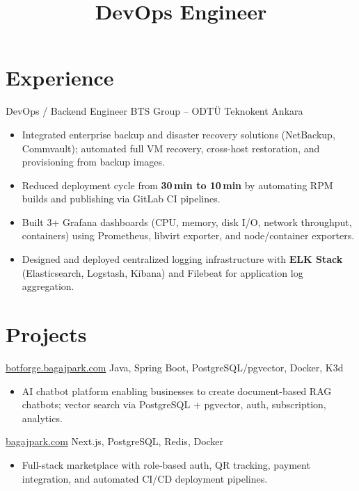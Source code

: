 \documentclass[10pt,a4paper,sans]{moderncv}
\title{DevOps Engineer}
\begin{document}
\makecvtitle

\section{Experience}

{DevOps / Backend Engineer}
{BTS Group -- ODTÜ Teknokent}
{Ankara}
{}{
\begin{itemize}
    \setlength\itemsep{0pt}
    \item Integrated enterprise backup and disaster recovery solutions (NetBackup, Commvault);
          automated full VM recovery, cross-host restoration, and provisioning from backup images.
    \item Reduced deployment cycle from \textbf{30\,min to 10\,min} by automating RPM builds
          and publishing via GitLab CI pipelines.
    \item Built 3+ Grafana dashboards (CPU, memory, disk I/O, network throughput, containers)
          using Prometheus, libvirt exporter, and node/container exporters.
    \item Designed and deployed centralized logging infrastructure with \textbf{ELK Stack}
          (Elasticsearch, Logstash, Kibana) and Filebeat for application log aggregation.
\end{itemize}
}

\section{Projects}

{\href{https://botforge.bagajpark.com}{botforge.bagajpark.com}}{}
{Java, Spring Boot, PostgreSQL/pgvector, Docker, K3d}
{\begin{itemize}\setlength\itemsep{0pt}
    \item AI chatbot platform enabling businesses to create document-based RAG chatbots;
          vector search via PostgreSQL + pgvector, auth, subscription, analytics.
\end{itemize}}

{\href{https://bagajpark.com}{bagajpark.com}}{}
{Next.js, PostgreSQL, Redis, Docker}
{\begin{itemize}\setlength\itemsep{0pt}
    \item Full-stack marketplace with role-based auth, QR tracking, payment integration,
          and automated CI/CD deployment pipelines.
\end{itemize}}
\end{document}

